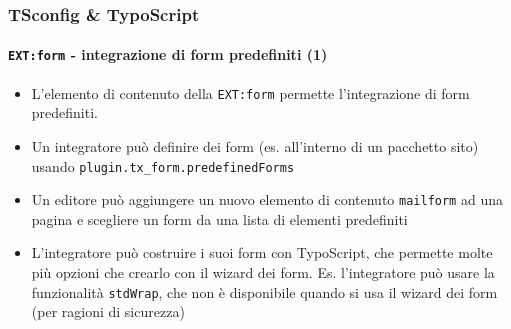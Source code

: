 \begin{frame}[fragile]
	\frametitle{TSconfig \& TypoScript}
	\framesubtitle{\texttt{EXT:form} - integrazione di form predefiniti (1)}

	\lstset{basicstyle=\tiny\ttfamily}

	\begin{itemize}

		\item L'elemento di contenuto della \texttt{EXT:form} permette l'integrazione di form
			predefiniti.

		\item Un integratore può definire dei form (es. all'interno di un pacchetto sito) usando
			\texttt{plugin.tx\_form.predefinedForms}

		\item Un editore può aggiungere un nuovo elemento di contenuto \texttt{mailform} ad una pagina e
			scegliere un form da una lista di elementi predefiniti

		\item L'integratore può costruire i suoi form con TypoScript, che permette molte più opzioni che
			crearlo con il wizard dei form. Es. l'integratore può usare la funzionalità
			\texttt{stdWrap}, che non è disponibile quando si usa il wizard dei form (per ragioni di sicurezza)

	\end{itemize}

\end{frame}

